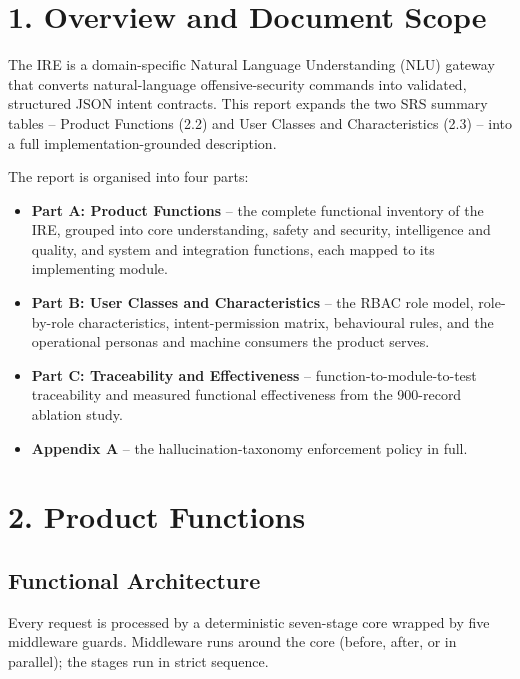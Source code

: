 \documentclass[10pt,journal,onecolumn]{IEEEtran}
\begin{document}
\section{1. Overview and Document Scope}

The IRE is a domain-specific Natural Language Understanding (NLU) gateway that converts natural-language offensive-security commands into validated, structured JSON intent contracts. This report expands the two SRS summary tables -- Product Functions (2.2) and User Classes and Characteristics (2.3) -- into a full implementation-grounded description.

The report is organised into four parts:

\begin{itemize}
\item \textbf{Part A: Product Functions} -- the complete functional inventory of the IRE, grouped into core understanding, safety and security, intelligence and quality, and system and integration functions, each mapped to its implementing module.
\item \textbf{Part B: User Classes and Characteristics} -- the RBAC role model, role-by-role characteristics, intent-permission matrix, behavioural rules, and the operational personas and machine consumers the product serves.
\item \textbf{Part C: Traceability and Effectiveness} -- function-to-module-to-test traceability and measured functional effectiveness from the 900-record ablation study.
\item \textbf{Appendix A} -- the hallucination-taxonomy enforcement policy in full.
\end{itemize}

\section{2. Product Functions}

\subsection{Functional Architecture}

Every request is processed by a deterministic seven-stage core wrapped by five middleware guards. Middleware runs around the core (before, after, or in parallel); the stages run in strict sequence.
\end{document}
